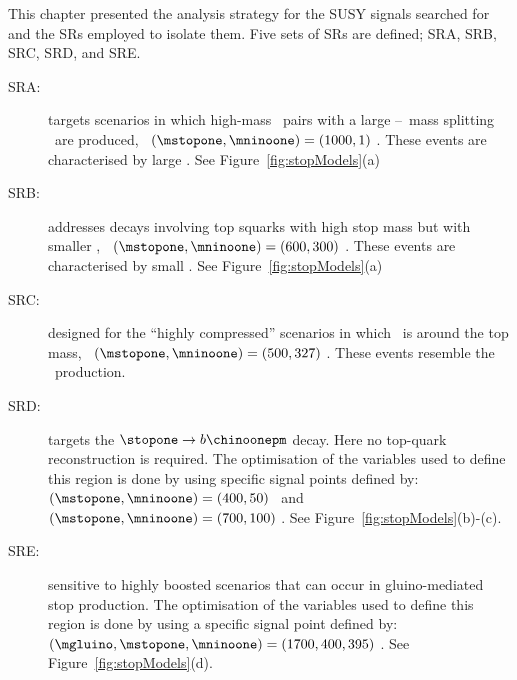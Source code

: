 
		This chapter presented the analysis strategy for the \ac{SUSY} signals searched for and the \acp{SR} employed to isolate them. Five sets of \acp{SR} are defined; SRA, SRB, SRC, SRD, and SRE. 

		\begin{description}
		
			\item [SRA:] targets scenarios in which high-mass \stop\ pairs with a large \stop--\ninoone\ mass splitting \dmstopnino\ are produced, \eg\ $(\mstopone, \mninoone) = (1000,1)$ \GeV. These events are characterised by large \met. See Figure~\ref{fig:stopModels}(a)

			\item [SRB:] addresses decays involving top squarks with high stop mass but with smaller \dmstopnino, \eg\ $(\mstopone, \mninoone) = (600, 300)$ \GeV. These events are characterised by small \met. See Figure~\ref{fig:stopModels}(a)

			\item [SRC:] designed for the ``highly compressed'' scenarios in which \dmstopnino\ is around the top mass, \eg\ $(\mstopone, \mninoone) = (500, 327)$ \GeV. These events resemble the \ttbar\ production.

			\item [SRD:] targets the $\stopone \to b \chinoonepm$ decay. Here no top-quark reconstruction is required. The optimisation of the variables used to define this region is done by using specific signal points defined by: $(\mstopone, \mninoone) = (400,50)$ \GeV\ and $(\mstopone, \mninoone) = (700,100)$ \GeV. See Figure~\ref{fig:stopModels}(b)-(c).
			
			\item [SRE:] sensitive to highly boosted scenarios that can occur in gluino-mediated stop production. The optimisation of the variables used to define this region is done by using a specific signal point defined by: $(\mgluino, \mstopone, \mninoone) = (1700, 400, 395)$ \GeV. See Figure~\ref{fig:stopModels}(d).

		\end{description}

